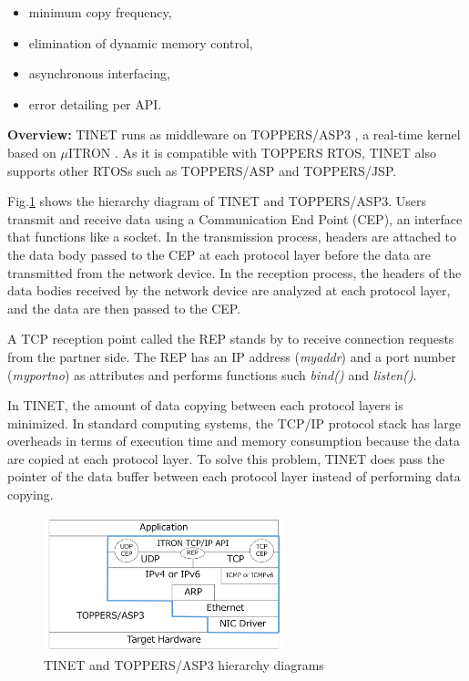 \documentclass[JIP]{ipsj_v2/UTF8/ipsj}
\begin{document}
\begin{itemize}
    \item minimum copy frequency,
    \item elimination of dynamic memory control,
    \item asynchronous interfacing,
    \item error detailing per API.
\end{itemize}

{\bf Overview:}
TINET runs as middleware on TOPPERS/ASP3 \cite{par:ASP3} \cite{url:ASP3}, a real-time kernel based on $\mu$ITRON \cite{par:microITRON}.
As it is compatible with TOPPERS RTOS, TINET also supports other RTOSs such as TOPPERS/ASP and TOPPERS/JSP.

Fig.\ref{fig:TINETHierarchyDiagram} shows the hierarchy diagram of TINET and TOPPERS/ASP3.
Users transmit and receive data using a Communication End Point (CEP), an interface that functions like a socket.
In the transmission process, headers are attached to the data body passed to the CEP at each protocol layer before the data are transmitted from the network device.
In the reception process, the headers of the data bodies received by the network device are analyzed at each protocol layer, and the data are then passed to the CEP.

A TCP reception point called the REP stands by to receive connection requests from the partner side.
The REP has an IP address ({\it myaddr}) and a port number ({\it myportno}) as attributes and performs functions such {\it bind()} and {\it listen()}.

In TINET, the amount of data copying between each protocol layers is minimized.
In standard computing systems, the TCP/IP protocol stack has large overheads in terms of execution time and memory consumption because the data are copied at each protocol layer.
To solve this problem, TINET does pass the pointer of the data buffer between each protocol layer instead of performing data copying.

\begin{figure}[t]
    \centering
    \includegraphics[width=7.0cm,clip]{figure/TINETHierarchyDiagram.pdf}
    \caption{TINET and TOPPERS/ASP3 hierarchy diagrams}
    \label{fig:TINETHierarchyDiagram}
\end{figure}
\end{document}
